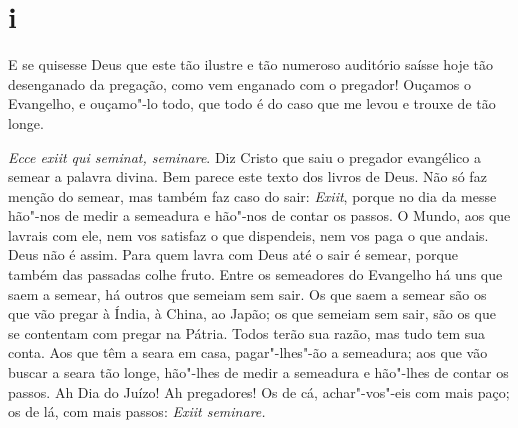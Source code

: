 \section*{i}

\noindent{}E se quisesse Deus que este tão ilustre e tão numeroso auditório saísse
hoje tão desenganado da pregação, como vem enganado com o pregador!
Ouçamos o Evangelho, e ouçamo"-lo todo, que todo é do caso que me levou e
trouxe de tão longe.

\emph{Ecce exiit qui seminat, seminare}. Diz Cristo que saiu o pregador evangélico a semear a palavra divina. Bem parece este texto dos
livros de Deus. Não só faz menção do semear, mas também faz caso do
sair: \emph{Exiit}, porque no dia da messe hão"-nos de medir a semeadura
e hão"-nos de contar os passos. O Mundo, aos que lavrais com ele, nem vos
satisfaz o que dispendeis, nem vos paga o que andais. Deus não é assim.
Para quem lavra com Deus até
o sair é semear, porque também das passadas colhe fruto. Entre os
semeadores do Evangelho há uns que saem a semear, há outros que
semeiam sem sair. Os que saem a semear são os que vão pregar à Índia, à
China, ao Japão; os que semeiam sem sair, são os que se contentam com
pregar na Pátria. Todos terão sua razão, mas tudo tem sua conta. Aos que
têm a seara em casa, pagar"-lhes"-ão a semeadura; aos que vão buscar a
seara tão longe, hão"-lhes de medir a semeadura e hão"-lhes de contar os
passos. Ah Dia do Juízo! Ah pregadores! Os de cá, achar"-vos"-eis com mais
paço; os de lá, com mais passos: \emph{Exiit seminare.}


